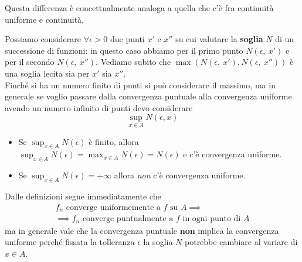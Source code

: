 \begin{observe}
	Questa differenza è concettualmente analoga a quella che c'è fra continuità uniforme e continuità.
\end{observe}
\begin{observe}
	Possiamo considerare $\forall \epsilon >0$ due punti $x'$ e $x''$ su cui valutare la \textbf{soglia} $N$ di un successione di funzioni: in questo caso abbiamo per il primo punto $N\left(\epsilon,\ x'\right)$ e per il secondo $N\left(\epsilon,\ x''\right)$. Vediamo subito che $\max\left(N\left(\epsilon,\ x'\right),N\left(\epsilon,\ x''\right)\right)$ è una soglia lecita sia per $x'$ sia $x''$.\\
	Finché si ha un numero finito di punti si può considerare il massimo, ma in generale se voglio passare dalla convergenza puntuale alla convergenza uniforme avendo un numero infinito di punti devo considerare
	\begin{equation*}
		\sup_{x\in A}N\left(\epsilon, x\right)
	\end{equation*}
\begin{itemize}
	\item Se $\displaystyle\sup_{x\in A}N\left(\epsilon\right)$ è finito, allora $\displaystyle\sup_{x\in A}N\left(\epsilon\right)=\max_{x\in A}N\left(\epsilon\right)=N\left(\epsilon\right)$ e c'è convergenza uniforme.
	\item Se $\displaystyle\sup_{x\in A}N\left(\epsilon\right)=+\infty$ allora \textit{non} c'è convergenza uniforme.
\end{itemize}
\end{observe}
Dalle definizioni segue immediatamente che\label{convuniformeimplicapuntuale}
	\begin{multline}
	f_n\text{ converge uniformemente a }f\text{ su }A\implies\\
	\implies f_n\text{ converge puntualmente a }f\text{ in ogni punto di }A
\end{multline}
ma in generale vale che la convergenza puntuale \textbf{non} implica la convergenza uniforme perché fissata la tolleranza $\epsilon$ la soglia $N$ potrebbe cambiare al variare di $x\in A$.
